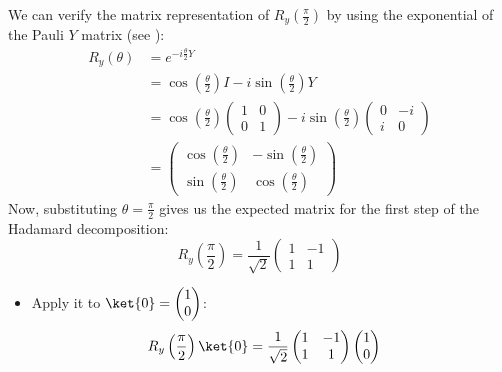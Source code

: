 \begin{enumerate}
    We can verify the matrix representation of $R_y\!\left(\frac{\pi}{2}\right)$ by using the exponential of the Pauli $Y$ matrix (see ):
    \begin{align*}
        R_y\left(\theta\right) &= e^{-i\frac{\theta}{2}Y} \\
        &= \cos\left(\frac{\theta}{2}\right)I - i\sin\left(\frac{\theta}{2}\right)Y \\
        &= \cos\left(\frac{\theta}{2}\right)\begin{pmatrix}
            1 & 0 \\ 0 & 1
        \end{pmatrix} -
        i \sin\left(\frac{\theta}{2}\right) \begin{pmatrix}
            0 & -i \\ i & 0
        \end{pmatrix} \\
        &= \begin{pmatrix}
            \cos\left(\frac{\theta}{2}\right) & -\sin\left(\frac{\theta}{2}\right) \\[.5em]
            \sin\left(\frac{\theta}{2}\right) & \cos\left(\frac{\theta}{2}\right)
        \end{pmatrix}
    \end{align*}
    Now, substituting $\theta = \frac{\pi}{2}$ gives us the expected matrix for the first step of the Hadamard decomposition:
    \begin{equation*}
        R_y\left(\frac{\pi}{2}\right) = \dfrac{1}{\sqrt{2}} \begin{pmatrix}
            1 & -1 \\ 1 & 1
        \end{pmatrix}
    \end{equation*}
    \begin{itemize}
        \item Apply it to $\ket{0} = \begin{pmatrix} 1 \\ 0 \end{pmatrix}$:
        \begin{align*}
            R_y\left(\frac{\pi}{2}\right)\ket{0} &= \dfrac{1}{\sqrt{2}} \begin{pmatrix}
                1 & -1 \\ 1 & 1
            \end{pmatrix} \begin{pmatrix}
                1 \\ 0

\end{pmatrix}
\end{align*}
\end{itemize}
\end{enumerate}
